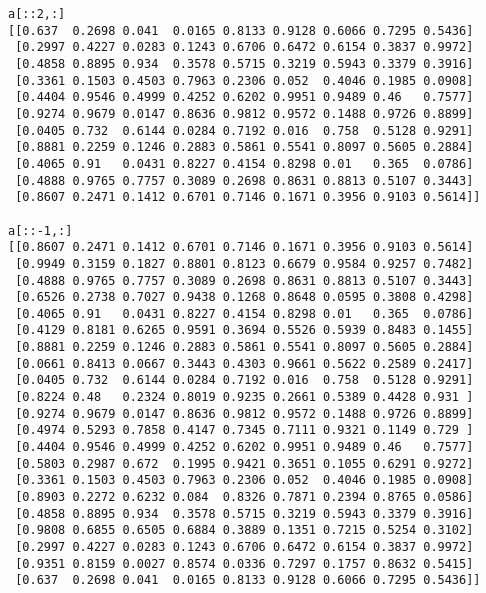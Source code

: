 \begin{verbatim}
a[::2,:]
[[0.637  0.2698 0.041  0.0165 0.8133 0.9128 0.6066 0.7295 0.5436]
 [0.2997 0.4227 0.0283 0.1243 0.6706 0.6472 0.6154 0.3837 0.9972]
 [0.4858 0.8895 0.934  0.3578 0.5715 0.3219 0.5943 0.3379 0.3916]
 [0.3361 0.1503 0.4503 0.7963 0.2306 0.052  0.4046 0.1985 0.0908]
 [0.4404 0.9546 0.4999 0.4252 0.6202 0.9951 0.9489 0.46   0.7577]
 [0.9274 0.9679 0.0147 0.8636 0.9812 0.9572 0.1488 0.9726 0.8899]
 [0.0405 0.732  0.6144 0.0284 0.7192 0.016  0.758  0.5128 0.9291]
 [0.8881 0.2259 0.1246 0.2883 0.5861 0.5541 0.8097 0.5605 0.2884]
 [0.4065 0.91   0.0431 0.8227 0.4154 0.8298 0.01   0.365  0.0786]
 [0.4888 0.9765 0.7757 0.3089 0.2698 0.8631 0.8813 0.5107 0.3443]
 [0.8607 0.2471 0.1412 0.6701 0.7146 0.1671 0.3956 0.9103 0.5614]]

a[::-1,:]
[[0.8607 0.2471 0.1412 0.6701 0.7146 0.1671 0.3956 0.9103 0.5614]
 [0.9949 0.3159 0.1827 0.8801 0.8123 0.6679 0.9584 0.9257 0.7482]
 [0.4888 0.9765 0.7757 0.3089 0.2698 0.8631 0.8813 0.5107 0.3443]
 [0.6526 0.2738 0.7027 0.9438 0.1268 0.8648 0.0595 0.3808 0.4298]
 [0.4065 0.91   0.0431 0.8227 0.4154 0.8298 0.01   0.365  0.0786]
 [0.4129 0.8181 0.6265 0.9591 0.3694 0.5526 0.5939 0.8483 0.1455]
 [0.8881 0.2259 0.1246 0.2883 0.5861 0.5541 0.8097 0.5605 0.2884]
 [0.0661 0.8413 0.0667 0.3443 0.4303 0.9661 0.5622 0.2589 0.2417]
 [0.0405 0.732  0.6144 0.0284 0.7192 0.016  0.758  0.5128 0.9291]
 [0.8224 0.48   0.2324 0.8019 0.9235 0.2661 0.5389 0.4428 0.931 ]
 [0.9274 0.9679 0.0147 0.8636 0.9812 0.9572 0.1488 0.9726 0.8899]
 [0.4974 0.5293 0.7858 0.4147 0.7345 0.7111 0.9321 0.1149 0.729 ]
 [0.4404 0.9546 0.4999 0.4252 0.6202 0.9951 0.9489 0.46   0.7577]
 [0.5803 0.2987 0.672  0.1995 0.9421 0.3651 0.1055 0.6291 0.9272]
 [0.3361 0.1503 0.4503 0.7963 0.2306 0.052  0.4046 0.1985 0.0908]
 [0.8903 0.2272 0.6232 0.084  0.8326 0.7871 0.2394 0.8765 0.0586]
 [0.4858 0.8895 0.934  0.3578 0.5715 0.3219 0.5943 0.3379 0.3916]
 [0.9808 0.6855 0.6505 0.6884 0.3889 0.1351 0.7215 0.5254 0.3102]
 [0.2997 0.4227 0.0283 0.1243 0.6706 0.6472 0.6154 0.3837 0.9972]
 [0.9351 0.8159 0.0027 0.8574 0.0336 0.7297 0.1757 0.8632 0.5415]
 [0.637  0.2698 0.041  0.0165 0.8133 0.9128 0.6066 0.7295 0.5436]]


\end{verbatim}
